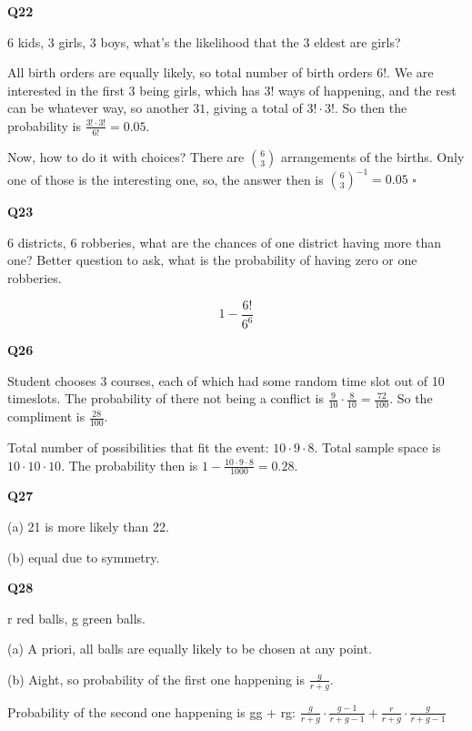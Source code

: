 \documentclass{article}
\newcommand{\qed}{\hfill$\square$}
\begin{document}
		\textbf{Q22}
		
			6 kids, 3 girls, 3 boys, what's the likelihood that the 3 eldest are girls?
			
			All birth orders are equally likely, so total number of birth orders $6!$. We are interested in the first 3 being girls, which has $3!$ ways of happening, and the rest can be whatever way, so another $31$, giving a total of $3! \cdot 3!$. So then the probability is $\frac{3!\cdot 3!}{6!} = 0.05$.
			
			Now, how to do it with choices? There are ${6 \choose 3}$ arrangements of the births. Only one of those is the interesting one, so, the answer then is ${6 \choose 3}^{-1} = 0.05$ \qed
			
			\hfill
			
		\textbf{Q23}
		
			6 districts, 6 robberies, what are the chances of one district having more than one? Better question to ask, what is the probability of having zero or one robberies.
			
			$$1 - \frac{6!}{6^6}$$
			
			\hfill
			
		\textbf{Q26}
		
			Student chooses 3 courses, each of which had some random time slot out of 10 timeslots. The probability of there not being a conflict is $\frac{9}{10} \cdot \frac{8}{10} = \frac{72}{100}$. So the compliment is $\frac{28}{100}$.
			
			Total number of possibilities that fit the event: $10 \cdot 9 \cdot 8$. Total sample space is $10 \cdot 10 \cdot 10$. The probability then is $1 - \frac{10 \cdot 9 \cdot 8}{1000} = 0.28$.
			
			\hfill
			
		\textbf{Q27}
		
		(a) 21 is more likely than 22.
		
		(b) equal due to symmetry.
		
		\hfill
		
		\textbf{Q28}
		
			r red balls, g green balls.
			
			(a) A priori, all balls are equally likely to be chosen at any point. 
			
			(b) Aight, so probability of the first one happening is $\frac{g}{r+g}$.
			
			Probability of the second one happening is gg + rg: $\frac{g}{r+g} \cdot \frac{g-1}{r+g-1} + \frac{r}{r+g} \cdot \frac{g}{r+g-1} $
			
\end{document}
